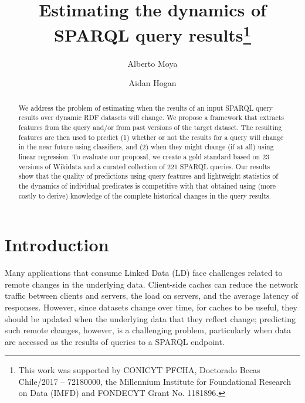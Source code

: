 \documentclass[runningheads]{llncs}
\begin{document}
%
\title{Estimating the dynamics of SPARQL query results\thanks{This work was supported by CONICYT PFCHA, Doctorado Becas Chile/2017 -- 72180000, the Millennium Institute for Foundational Research on Data (IMFD) and FONDECYT Grant No. 1181896.}}
%
%
\author{Alberto Moya \and 
Aidan Hogan}
%
%
%
\maketitle              %
%
\begin{abstract}
We address the problem of estimating when the results of an input SPARQL query results over dynamic RDF datasets will change. We propose a framework that extracts features from the query and/or from past versions of the target dataset. The resulting features are then used to predict (1) whether or not the results for a query will change in the near future using classifiers, and (2) when they might change (if at all) using linear regression. To evaluate our proposal, we create a gold standard based on 23 versions of Wikidata and a curated collection of 221 SPARQL queries. Our results show that the quality of predictions using query features and lightweight statistics of the dynamics of individual predicates is competitive with that obtained using (more costly to derive) knowledge of the complete historical changes in the query results.

\end{abstract}
%
%
\section{Introduction}
\label{sec:intro}
%
Many applications that consume Linked Data (LD) face challenges related to remote changes in the underlying data. Client-side caches can reduce the network traffic between clients and servers, the load on servers, and the average latency of responses. However, since datasets change over time, for caches to be useful, they should be updated when the underlying data that they reflect change; predicting such remote changes, however, is a challenging problem, particularly when data are accessed as the results of queries to a SPARQL endpoint.
\end{document}
